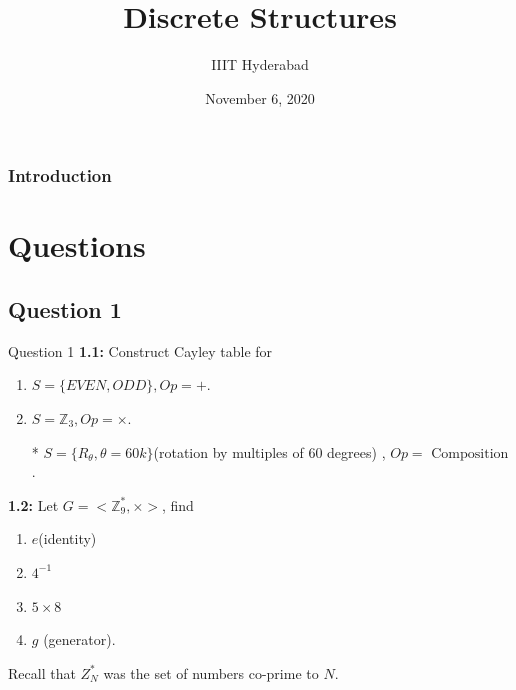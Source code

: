 \documentclass[xcolor=svgnames]{beamer}
\title[Discrete Structures]{Discrete Structures} %
\author{IIIT Hyderabad} %
\institute[] %
{
Monsoon 2020 \\ %
\medskip
\textit{Tutorial 14} %
}
\date{November 6, 2020} %
\begin{document}
\begin{frame}
\titlepage %
\end{frame}

\begin{frame}
\frametitle{Introduction} %
\tableofcontents %
\end{frame}


\section{Questions}

\subsection{Question 1}


\begin{frame}{Question 1}
\textbf{1.1:} Construct Cayley table for 
\begin{enumerate}
    \item $S = \{EVEN, ODD\}, Op = +$.
    \item $S = \mathbb{Z}_3, Op = \times$.
    \item [*] $S = \{R_{\theta}, \theta = 60k \}$(rotation by multiples of 60 degrees)  , $Op = \text{ Composition}$ .
\end{enumerate}
\textbf{1.2:} Let $G = <\mathbb{Z}_{9}^*,\times>$, find 
\begin{enumerate}
    \item $e$(identity)
    \item $4^{-1}$
    \item $5 \times 8$
    \item $g$ (generator).
\end{enumerate}
Recall that $Z^{*}_{N}$ was the set of numbers co-prime to $N$.
\end{frame}
\end{document}
